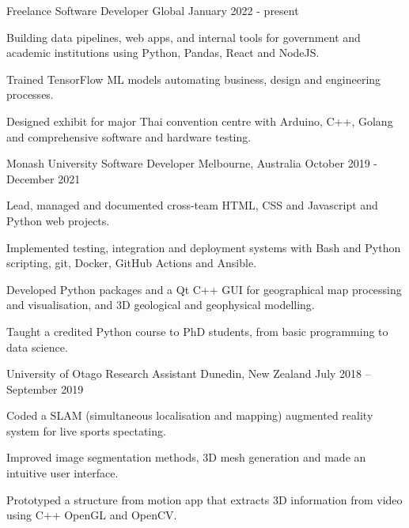 


\begin{cventries}
  \cventry
    {Freelance} %
	{Software Developer} %
    {Global} %
    {January 2022 - present} %
    {
      \begin{cvitems} %
		  \item {
			Building data pipelines, web apps, and internal tools for government and academic institutions using Python, Pandas, React and NodeJS.
			  }
		  \item {
			Trained TensorFlow ML models automating business, design and engineering processes.
			  }
		  \item {
			 Designed exhibit for major Thai convention centre with Arduino, C++, Golang and comprehensive software and hardware testing.
			  }
      \end{cvitems}
    }

  \cventry
    {Monash University} %
    {Software Developer} %
    {Melbourne, Australia} %
    {October 2019 - December 2021} %
    {
      \begin{cvitems} %
		  \item {
		Lead, managed and documented cross-team HTML, CSS and Javascript and Python web projects.
			  }
		  \item {
Implemented testing, integration and deployment systems with Bash and Python scripting, git, Docker, GitHub Actions and Ansible.
			  } 
		  \item {
		Developed Python packages and a Qt C++ GUI for geographical map processing and visualisation, and 3D geological and geophysical modelling.
			  }
		  \item {
Taught a credited Python course to PhD students, from basic programming to data science.
			  }
      \end{cvitems}
    }

  \cventry
    {University of Otago} %
    {Research Assistant} %
    {Dunedin, New Zealand} %
    {July 2018 – September 2019} %
    {
      \begin{cvitems} %
        \item {Coded a SLAM (simultaneous localisation and mapping) augmented reality system for live sports spectating.}
        \item {Improved image segmentation methods, 3D mesh generation and made an intuitive user interface.}
        \item {Prototyped a structure from motion app that extracts 3D information from video using C++ OpenGL and OpenCV. }
      \end{cvitems}
    }


\end{cventries}
